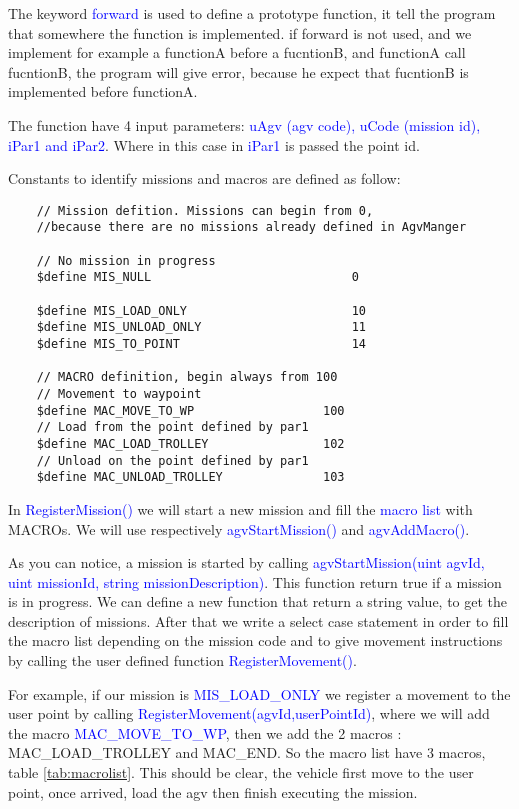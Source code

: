 The keyword \textcolor{blue}{forward} is used to define a prototype function, it tell the program that somewhere the function is implemented. if {forward} is not used, and we implement for example a functionA before a fucntionB, and functionA call fucntionB, the program will give error, because he expect that fucntionB is implemented before functionA.

The function have 4 input parameters: \textcolor{blue}{uAgv (agv code), uCode (mission id), iPar1 and iPar2}. Where in this case in \textcolor{blue}{iPar1} is passed the point id.

Constants to identify missions and macros are defined as follow:\\

\begin{lstlisting}
	// Mission defition. Missions can begin from 0, 
	//because there are no missions already defined in AgvManger
	
	// No mission in progress
	$define MIS_NULL							0
	
	$define MIS_LOAD_ONLY						10
	$define MIS_UNLOAD_ONLY						11
	$define MIS_TO_POINT						14
	
	// MACRO definition, begin always from 100
	// Movement to waypoint
	$define MAC_MOVE_TO_WP					100
	// Load from the point defined by par1
	$define MAC_LOAD_TROLLEY				102
	// Unload on the point defined by par1
	$define MAC_UNLOAD_TROLLEY				103
\end{lstlisting}

In \textcolor{blue}{RegisterMission()} we will start a new mission and fill the \textcolor{blue}{macro list} with MACROs. We will use respectively \textcolor{blue}{agvStartMission()} and \textcolor{blue}{agvAddMacro()}.

As you can notice, a mission is started by calling \textcolor{blue}{agvStartMission(uint agvId, uint missionId, string missionDescription)}. This function return true if a mission is in progress. We can define a new function that return a string value, to get the description of missions.
After that we write a select case statement in order to fill the macro list depending on the mission code and to give movement instructions by calling the user defined function \textcolor{blue}{RegisterMovement()}.

For example, if our mission is \textcolor{blue}{MIS\_LOAD\_ONLY}  we register a movement to the user point by calling \textcolor{blue}{RegisterMovement(agvId,userPointId)}, where we will add the macro \textcolor{blue}{MAC\_MOVE\_TO\_WP}, then we add the 2 macros : MAC\_LOAD\_TROLLEY and MAC\_END. So the macro list have 3 macros, table \ref{tab:macrolist}. This should be clear, the vehicle first move to the user point, once arrived, load the agv then finish executing the mission.


